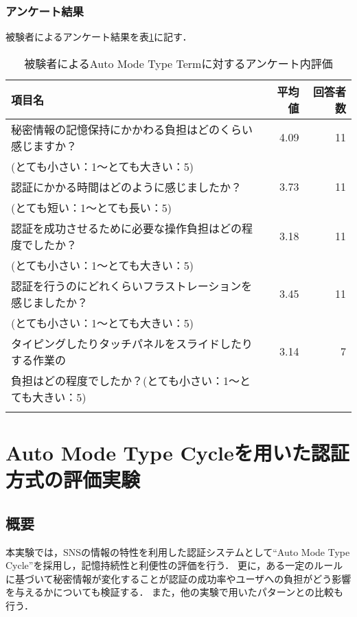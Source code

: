\subsubsection{アンケート結果}
被験者によるアンケート結果を表\ref{tab:auto_term.enquete}に記す．
\begin{table}[ht]
  \caption{被験者によるAuto Mode Type Termに対するアンケート内評価}
  \label{tab:auto_term.enquete}
  \begin{center}
    \small
    \begin{tabular}{lrr}
      \bhline
      項目名 & 平均値 & 回答者数 \\ \hline
      秘密情報の記憶保持にかかわる負担はどのくらい感じますか？ & 4.09 & 11 \\
      (とても小さい：1〜とても大きい：5) & & \\
      認証にかかる時間はどのように感じましたか？ & 3.73 & 11 \\
      (とても短い：1〜とても長い：5) & & \\
      認証を成功させるために必要な操作負担はどの程度でしたか？ & 3.18 & 11 \\
      (とても小さい：1〜とても大きい：5) & & \\
      認証を行うのにどれくらいフラストレーションを感じましたか？ & 3.45 & 11 \\
      (とても小さい：1〜とても大きい：5) & & \\
      タイピングしたりタッチパネルをスライドしたりする作業の & 3.14 & 7 \\
      負担はどの程度でしたか？(とても小さい：1〜とても大きい：5) & & \\
      \bhline
    \end{tabular}
  \end{center}
\end{table}

\section{Auto Mode Type Cycleを用いた認証方式の評価実験}\label{sec:vsCycle}
\subsection{概要}
本実験では，SNSの情報の特性を利用した認証システムとして``Auto Mode Type Cycle''を採用し，記憶持続性と利便性の評価を行う．
更に，ある一定のルールに基づいて秘密情報が変化することが認証の成功率やユーザへの負担がどう影響を与えるかについても検証する．
また，他の実験で用いたパターンとの比較も行う．

